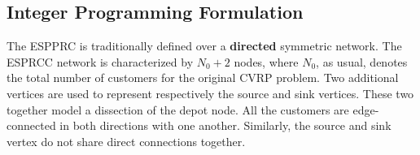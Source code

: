 \begin{comment}

[MY OWN STUFF, kept for reference purpose. TODO: Merge or delete later]
\subsection{Shortest Path Problem with Resource Constraints}
If there are no negative cost cyles, e.g. when the reduced cost variables are positive $\bar{c}_{ij} \ge 0$,
the ESPPRC problem is solvable in polynomial time, since the elementarity conditions are guaranteed
to be satisfied in this case.
In this particular case, some authors have proposed efficient methods to tackle this case:
\cite{beasley1989}, \cite{carlyle2008}, \cite{dumitrescu2003}, \cite{muhandiramge2009}.
These proposed approaches work under the assumption that no negative cost cycle is present,
and use lagrangian relaxation to relax the capacity constraints.

\subsection{Elementary Shortest Path Problem with Resource Constraints}
In the case where the network may be contain negative cost cycles, the
elementarity condition must be explicitly modeled, or relaxed, in order
to obtain reasonable dual bound solutions for the CVRP.
\textcite{feillet2004} proposes a dynamic programming algorithm where
the elementary property is handled through the usage of an additional resource
bound to each node.
\textcite{righini2006} proposes a bi-directional dynamic programming algorithm to solve the ESPPRC.
\end{comment}

\subsection{Integer Programming Formulation}
\label{sec:espprc-integer-programming-formulation}

The ESPPRC is traditionally defined over a \textbf{directed}
symmetric network.
The ESPRCC network is characterized by $N_0 + 2$ nodes,
where $N_0$, as usual, denotes the total number of customers for the original CVRP problem.
Two additional vertices are used to represent respectively the source and sink vertices.
These two together model a dissection of the depot node.
All the customers are edge-connected in both directions with one another.
Similarly, the source and sink vertex do not share direct connections together.

